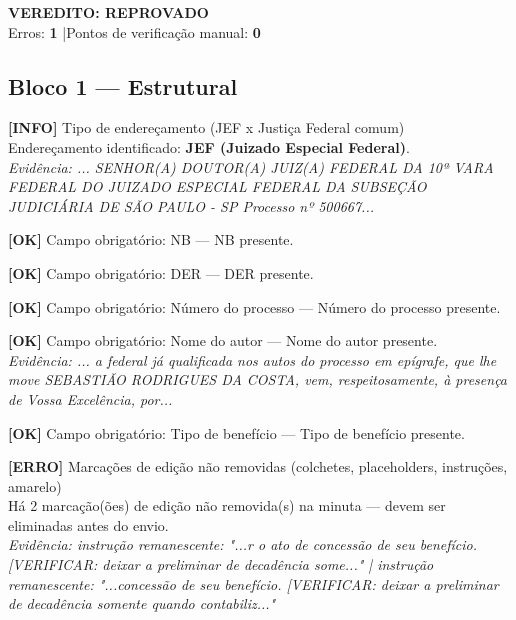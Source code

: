 \documentclass[12pt,a4paper]{article}
\newcommand{\statusOK}[1]{\textcolor{corOK}{\textbf{[OK]}} #1}
\newcommand{\statusERRO}[1]{\textcolor{corERRO}{\textbf{[ERRO]}} #1}
\newcommand{\statusINFO}[1]{\textcolor{corINFO}{\textbf{[INFO]}} #1}
\begin{document}
\vspace{0.5em}

\noindent\colorbox{corFundoReprovado}{%
  \begin{minipage}{\dimexpr\linewidth-2\fboxsep}
    \centering
    \vspace{0.3em}
    {\large \textcolor{corERRO}{\textbf{VEREDITO: REPROVADO}}}\\
    Erros: \textbf{1} \quad|\quad Pontos de verificação manual: \textbf{0}
    \vspace{0.3em}
  \end{minipage}%
}

\vspace{1em}


\subsection{Bloco 1 --- Estrutural}

\statusINFO{Tipo de endereçamento (JEF x Justiça Federal comum)}\\
Endereçamento identificado: \textbf{JEF (Juizado Especial Federal)}.\\
\textit{Evidência: ... SENHOR(A) DOUTOR(A) JUIZ(A) FEDERAL DA 10ª VARA FEDERAL DO JUIZADO ESPECIAL FEDERAL DA SUBSEÇÃO JUDICIÁRIA DE SÃO PAULO - SP Processo nº 500667...}

\medskip
\statusOK{Campo obrigatório: NB} --- NB presente.

\medskip
\statusOK{Campo obrigatório: DER} --- DER presente.

\medskip
\statusOK{Campo obrigatório: Número do processo} --- Número do processo presente.

\medskip
\statusOK{Campo obrigatório: Nome do autor} --- Nome do autor presente.\\
\textit{Evidência: ... a federal já qualificada nos autos do processo em epígrafe, que lhe move SEBASTIÃO RODRIGUES DA COSTA, vem, respeitosamente, à presença de Vossa Excelência, por...}

\medskip
\statusOK{Campo obrigatório: Tipo de benefício} --- Tipo de benefício presente.

\medskip
\statusERRO{Marcações de edição não removidas (colchetes, placeholders, instruções, amarelo)}\\
Há 2 marcação(ões) de edição não removida(s) na minuta --- devem ser eliminadas antes do envio.\\
\textit{Evidência: instrução remanescente: "...r o ato de concessão de seu benefício. [VERIFICAR: deixar a preliminar de decadência some..." | instrução remanescente: "...concessão de seu benefício. [VERIFICAR: deixar a preliminar de decadência somente quando contabiliz..."}
\end{document}
